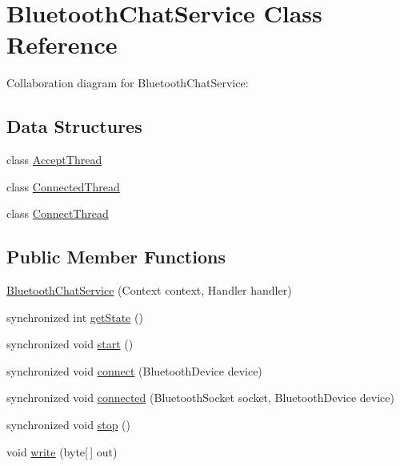 \hypertarget{classcom_1_1example_1_1android_1_1_bluetooth_chat_1_1_bluetooth_chat_service}{\section{Bluetooth\-Chat\-Service Class Reference}
\label{classcom_1_1example_1_1android_1_1_bluetooth_chat_1_1_bluetooth_chat_service}
}


Collaboration diagram for Bluetooth\-Chat\-Service\-:
\subsection*{Data Structures}
\begin{DoxyCompactItemize}
\item 
class \hyperlink{classcom_1_1example_1_1android_1_1_bluetooth_chat_1_1_bluetooth_chat_service_1_1_accept_thread}{Accept\-Thread}
\item 
class \hyperlink{classcom_1_1example_1_1android_1_1_bluetooth_chat_1_1_bluetooth_chat_service_1_1_connected_thread}{Connected\-Thread}
\item 
class \hyperlink{classcom_1_1example_1_1android_1_1_bluetooth_chat_1_1_bluetooth_chat_service_1_1_connect_thread}{Connect\-Thread}
\end{DoxyCompactItemize}
\subsection*{Public Member Functions}
\begin{DoxyCompactItemize}
\item 
\hyperlink{classcom_1_1example_1_1android_1_1_bluetooth_chat_1_1_bluetooth_chat_service_a82aeace1fb85fa6450790cb18d9154e8}{Bluetooth\-Chat\-Service} (Context context, Handler handler)
\item 
synchronized int \hyperlink{classcom_1_1example_1_1android_1_1_bluetooth_chat_1_1_bluetooth_chat_service_a6a50c2d9aca011bf98c1ef858548b905}{get\-State} ()
\item 
synchronized void \hyperlink{classcom_1_1example_1_1android_1_1_bluetooth_chat_1_1_bluetooth_chat_service_ae3e5313b36e6f003857174584df1753e}{start} ()
\item 
synchronized void \hyperlink{classcom_1_1example_1_1android_1_1_bluetooth_chat_1_1_bluetooth_chat_service_a210e75ad8ad1a78004ee6fe643acd0aa}{connect} (Bluetooth\-Device device)
\item 
synchronized void \hyperlink{classcom_1_1example_1_1android_1_1_bluetooth_chat_1_1_bluetooth_chat_service_a7684309f45e8b4bbbe3478b7c6b7d786}{connected} (Bluetooth\-Socket socket, Bluetooth\-Device device)
\item 
synchronized void \hyperlink{classcom_1_1example_1_1android_1_1_bluetooth_chat_1_1_bluetooth_chat_service_a4bcef6dec76484d625984ace718f36fd}{stop} ()
\item 
void \hyperlink{classcom_1_1example_1_1android_1_1_bluetooth_chat_1_1_bluetooth_chat_service_a8f39f71b4e3de075a0b64236eb5ec876}{write} (byte\mbox{[}$\,$\mbox{]} out)
\end{DoxyCompactItemize}
